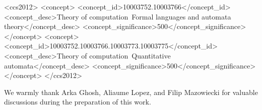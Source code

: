 \documentclass[manuscript,screen,review,natbib=false]{acmart}
\begin{document}
\begin{CCSXML}
<ccs2012>
  <concept>
    <concept_id>10003752.10003766</concept_id>
    <concept_desc>Theory of computation~Formal languages and automata theory</concept_desc>
    <concept_significance>500</concept_significance>
  </concept>
  <concept>
    <concept_id>10003752.10003766.10003773.10003775</concept_id>
    <concept_desc>Theory of computation~Quantitative automata</concept_desc>
    <concept_significance>500</concept_significance>
  </concept>
 </ccs2012>
\end{CCSXML}




\maketitle








% 

\begin{acks}
  We warmly thank Arka Ghosh, Aliaume Lopez, and Filip Mazowiecki %
  for valuable discussions during the preparation of this work.
\end{acks}

% 
% 

\printbibliography

\appendix

\end{document}
